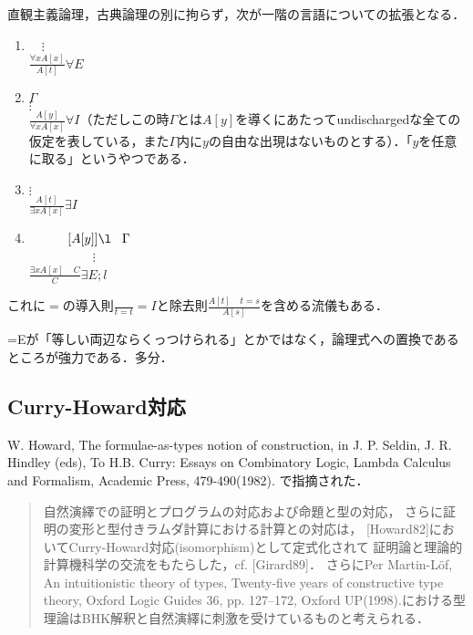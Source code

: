 \documentclass[uplatex, 12pt, dvipdfmx]{jsreport}
\begin{document}
\begin{definition}
    直観主義論理，古典論理の別に拘らず，次が一階の言語についての拡張となる．
    \begin{enumerate}
        \item 　$\vdots$\\
        $\frac{\forall xA[x]}{A[t]}\forall E$
        \item $\Gamma$\\
        $\vdots$\\
        $\frac{A[y]}{\forall xA[x]}\forall I$（ただしこの時$\Gamma$とは$A[y]$を導くにあたってundischargedな全ての仮定を表している，また$\Gamma$内に$y$の自由な出現はないものとする）．「$y$を任意に取る」というやつである．
        \item $\vdots$\\
        $\frac{A[t]}{\exists xA[x]}\exists I$
        \item 　　　$[A[y]]\l\;\;\;\Gamma$\\
        　　　　　$\vdots$\\
        $\frac{\exists xA[x]\;\;\;\;C}{C}\exists E;l$
    \end{enumerate}
    これに$=$の導入則$\frac{}{t=t}=I$と除去則$\frac{A[t]\;\;\;\;t=s}{A[s]}$を含める流儀もある．
\end{definition}
\begin{remark}
    =Eが「等しい両辺ならくっつけられる」とかではなく，論理式への置換であるところが強力である．多分．
\end{remark}

\subsection{Curry-Howard対応}
W. Howard, The formulae-as-types notion of construction, in J. P. Seldin, J. R. Hindley (eds), To H.B. Curry: Essays on Combinatory Logic, Lambda Calculus and Formalism, Academic Press, 479-490(1982).
で指摘された．
\begin{quote}
    自然演繹での証明とプログラムの対応および命題と型の対応，
    さらに証明の変形と型付きラムダ計算における計算との対応は，
    [Howard82]においてCurry-Howard対応(isomorphism)として定式化されて
    証明論と理論的計算機科学の交流をもたらした，cf. [Girard89]．
    さらにPer Martin-Löf, An intuitionistic theory of types, Twenty-five years of constructive type theory, Oxford Logic Guides 36, pp. 127–172, Oxford UP(1998).における型理論はBHK解釈と自然演繹に刺激を受けているものと考えられる．
\end{quote}
\end{document}
